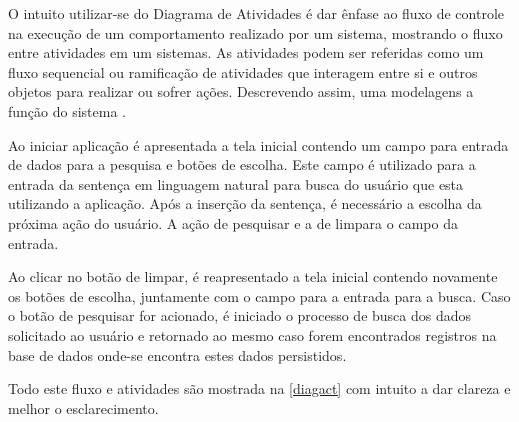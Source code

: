 O intuito utilizar-se do Diagrama de Atividades é dar ênfase ao fluxo de controle na execução de um comportamento realizado por um sistema, mostrando o fluxo entre atividades em um sistemas. As atividades podem ser referidas como um fluxo sequencial ou ramificação de atividades que interagem entre si e outros objetos para realizar ou sofrer ações. Descrevendo assim, uma modelagens a função do sistema \cite{Booch:2012}.  

Ao iniciar aplicação é apresentada a tela inicial contendo um campo para entrada de dados para a pesquisa e botões de escolha. Este campo é utilizado para a entrada da sentença em linguagem natural para busca do usuário que esta utilizando a aplicação. Após a inserção da sentença, é necessário a escolha da próxima ação do usuário. A ação de pesquisar e a de limpara o campo da entrada.

Ao clicar no botão de limpar, é reapresentado a tela inicial contendo novamente os botões de escolha, juntamente com o campo para a entrada para a busca. Caso o botão de pesquisar for acionado, é iniciado o processo de busca dos dados solicitado ao usuário e retornado ao mesmo caso forem encontrados registros na base de dados onde-se encontra estes dados persistidos.

Todo este fluxo e atividades são mostrada na \autoref{diagact} com intuito a dar clareza e melhor o esclarecimento.
